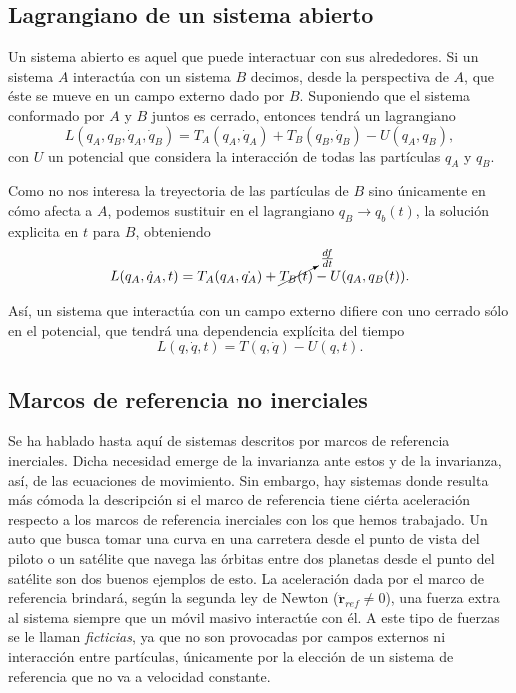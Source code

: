\subsection{Lagrangiano de un sistema abierto}

Un sistema abierto es aquel que puede interactuar con sus alrededores. Si un sistema $A$ interactúa con un sistema $B$ decimos, desde la perspectiva de $A$, que éste se mueve en un campo externo dado por $B$. Suponiendo que el sistema conformado por $A$ y $B$ juntos es cerrado, entonces tendrá un lagrangiano 
\begin{equation}
 L(q_A,q_B,\dot{q}_A,\dot{q}_B) = T_A(q_A,\dot{q}_A) + T_B(q_B,\dot{q}_B) - U(q_A,q_B),
\end{equation}
con $U$ un potencial que considera la interacción de todas las partículas $q_A$ y $q_B$.

Como no nos interesa la treyectoria de las partículas de $B$ sino únicamente en cómo afecta a $A$, podemos sustituir  en el lagrangiano $q_B \to q_b(t)$, la solución explicita en $t$ para $B$, obteniendo
\begin{align*}
 L(q_A,\dot{q}_A,t) = T_A(q_A,\dot{q_A}) + \cancelto{\frac{df}{dt}}{T_B(t)} - U(q_A,q_B(t)).
\end{align*}

Así, un sistema que interactúa con un campo externo difiere con uno cerrado sólo en el potencial, que tendrá una dependencia explícita del tiempo
\begin{equation}
 L(q,\dot{q},t) = T(q,\dot{q}) - U(q,t).
 \label{eq:lagrangian_open_generalized}
\end{equation}

\subsection{Marcos de referencia no inerciales}
\label{sec:ficticious_forces}

Se ha hablado hasta aquí de sistemas descritos por marcos de referencia inerciales. Dicha necesidad emerge de la invarianza ante estos y de la invarianza, así, de las ecuaciones de movimiento. Sin embargo, hay sistemas donde resulta más cómoda la descripción si el marco de referencia tiene ciérta aceleración respecto a los marcos de referencia inerciales con los que hemos trabajado. Un auto que busca tomar una curva en una carretera desde el punto de vista del piloto o un satélite que navega las órbitas entre dos planetas desde el punto del satélite son dos buenos ejemplos de esto. La aceleración dada por el marco de referencia brindará, según la segunda ley de Newton ($\ddot{\mathbf{r}}_{ref} \neq 0$), una fuerza extra al sistema siempre que un móvil masivo interactúe con él. A este tipo de fuerzas se le llaman \textit{ficticias}, ya que no son provocadas por campos externos ni interacción entre partículas, únicamente por la elección de un sistema de referencia que no va a velocidad constante. 

